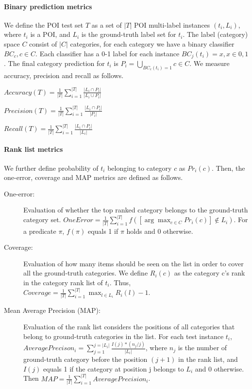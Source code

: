 \paragraph{Binary prediction metrics} We define the POI test set $T$ as
a set of $|T|$ POI multi-label instances $(t_i, L_i)$, where $t_i$ is a
POI, and $L_i$ is the ground-truth label set for $t_i$. The label (category)
space $C$ consist of $|C|$ categories, for each category we have a binary
classifier $BC_c, c \in C$. Each classifier has a 0-1 label for each instance
$BC_j(t_i) = x, x \in {0,1}$. The final category prediction for $t_i$ is
$P_i = \bigcup_{BC_c(t_i)=1} c \in C $.  We measure accuracy, precision and recall as follows.
\begin{description}
\centering
\item $Accuracy(T)=\frac{1}{|T|} \sum^{|T|}_{i=1} \frac{|L_i \cap P_i|}{|L_i \cup P_i|}$

\item $Precision(T)=\frac{1}{|T|} \sum^{|T|}_{i=1} \frac{|L_i \cap P_i|}{|P_i|}$

\item $Recall(T)=\frac{1}{|T|} \sum^{|T|}_{i=1} \frac{|L_i \cap P_i|}{|L_i|}$
\end{description}

\paragraph{Rank list metrics}
We further define probability of $t_i$ belonging to category $c$ as $Pr_i(c)$.
Then, the one-error, coverage and MAP metrics are defined as follows.
\begin{description}

\item[One-error:] Evaluation of whether the top ranked category belongs to the ground-truth category set. $OneError = \frac{1}{|T|} \sum^{|T|}_{i=1}f([\arg\max_{c \in C} Pr_i(c)] \notin L_i)$. For a predicate $\pi$, $f(\pi)$ equals 1 if $\pi$ holds and 0 otherwise.

\item[Coverage:] Evaluation of how many items should be seen on the list in order to cover all the ground-truth categories. We define $R_i(c)$ as the category c's rank in the category rank list of $t_i$. Thus, $Coverage = \frac{1}{|T|} \sum^{|T|}_{i=1} \max_{l \in L_i} R_i(l) -1$.

\item[Mean Average Precision (MAP):] Evaluation of the rank list considers the positions of all categories that belong to ground-truth categories in the list. For each test instance $t_i$, $AveragePrecison_i = \sum_{j=1}^{j=|L_i|} \frac{I(j)*(n_j/j)}{|L_i|}$, where $n_j$ is the number of ground-truth category before the position $(j+1)$ in the rank list, and $I(j)$ equals 1 if the category at position j belongs to $L_i$ and 0 otherwise. Then $MAP = \frac{1}{|T|} \sum^{|T|}_{i=1} AveragePrecision_i$.
\end{description}

